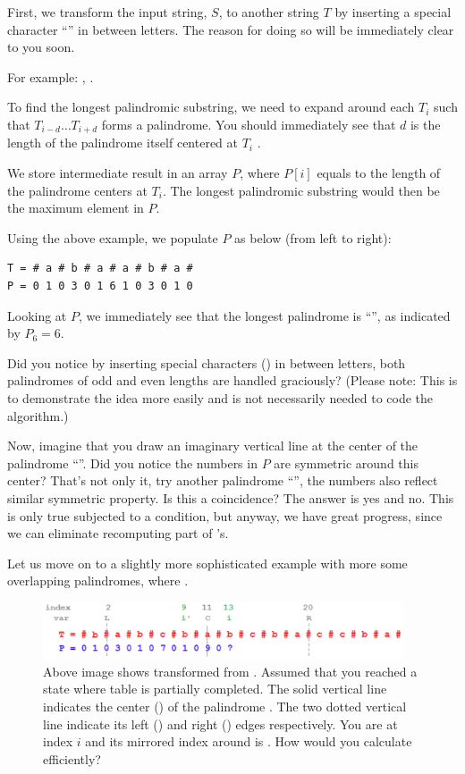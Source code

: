 First, we transform the input string, $S$, to another string $T$ by
inserting a special character ``\ctt{\#}'' in between letters. The reason
for doing so will be immediately clear to you soon.

For example: , .

To find the longest palindromic substring, we need to expand around each
$T_i$ such that $T_{i-d}\ldots T_{i+d}$ forms a palindrome. You should
immediately see that $d$ is the length of the palindrome itself centered at
$T_i$ .

We store intermediate result in an array $P$, where $P[i]$ equals to the
length of the palindrome centers at $T_i$. The longest palindromic substring
would then be the maximum element in $P$.

Using the above example, we populate $P$ as below (from left to right):
\begin{lstlisting}[style=raygeneric]
T = # a # b # a # a # b # a #
P = 0 1 0 3 0 1 6 1 0 3 0 1 0
\end{lstlisting}
Looking at $P$, we immediately see that the longest palindrome is
``'', as indicated by $P_6=6$.

Did you notice by inserting special characters (\ctt{\#}) in between
letters, both palindromes of odd and even lengths are handled graciously?
(Please note: This is to demonstrate the idea more easily and is not
necessarily needed to code the algorithm.)

Now, imagine that you draw an imaginary vertical line at the center of the
palindrome ``''. Did you notice the numbers in $P$ are symmetric
around this center? That's not only it, try another palindrome
``'', the numbers also reflect similar symmetric property. Is this
a coincidence? The answer is yes and no. This is only true subjected to a
condition, but anyway, we have great progress, since we can eliminate
recomputing part of 's.

Let us move on to a slightly more sophisticated example with more some
overlapping palindromes, where .

\begin{figure}
\centering
\includegraphics[width=0.95\textwidth]{Images/figLCLngstPlndrmcSubstring1}
\caption{Above image shows  transformed from
  .  Assumed that you reached a state where table
   is partially completed. The solid vertical line indicates the
  center () of the palindrome . The two dotted
  vertical line indicate its left () and right () edges
  respectively. You are at index $i$ and its mirrored index around 
  is . How would you calculate  efficiently?}
\end{figure}

